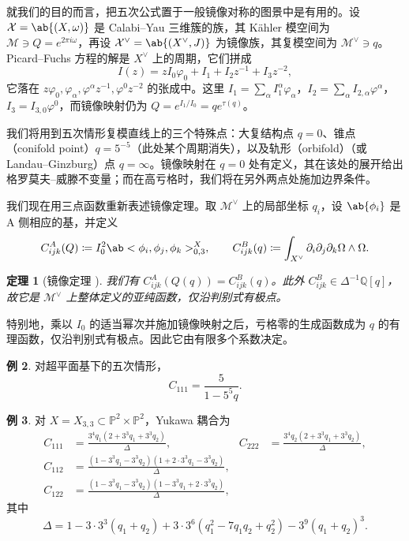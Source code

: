\documentclass{amsart}
\newtheorem{thm}{定理}[section]
\theoremstyle{definition}
\newtheorem{exm}[thm]{例}
\theoremstyle{remark}
\theoremstyle{plain}
\theoremstyle{definition}
\theoremstyle{remark}
\newcommand{\Q}{\mathbb{Q}}
\renewcommand{\P}{\mathbb{P}}
\newcommand{\mc}[1]{\mathcal{#1}}
\newcommand{\1}{\mathbf{1}}
\newcommand{\2}{\mathbf{2}}
\newcommand{\3}{\mathbf{3}}
\begin{document}
就我们的目的而言，把五次公式置于一般镜像对称的图景中是有用的。设 \(\mc{X} = \ab\{(X,\omega)\}\) 是 Calabi–Yau 三维簇的族，其 Kähler 模空间为 \(\mc{M} \ni Q = e^{2\pi i \omega}\)，再设 \(\mc{X}^{\vee} = \ab\{(X^{\vee},J)\}\) 为镜像族，其复模空间为 \(\mc{M}^{\vee} \ni q\)。Picard–Fuchs 方程的解是 \(X^{\vee}\) 上的周期，它们拼成
\[ I(z) = zI_0\varphi_0 + I_1 + I_2 z^{-1} + I_3 z^{-2}, \]
它落在 \(z\varphi_0, \varphi_{\alpha}, \varphi^{\alpha}z^{-1}, \varphi^0 z^{-2}\) 的张成中。这里 \(I_1 = \sum_{\alpha} I_1^{\alpha}\varphi_{\alpha}\)，\(I_2 = \sum_{\alpha} I_{2,\alpha}\varphi^{\alpha}\)，\(I_3 = I_{3,0}\varphi^0\)，而镜像映射仍为 \(Q = e^{I_1/I_0} = qe^{\tau(q)}\)。

我们将用到五次情形复模直线上的三个特殊点：大复结构点 \(q=0\)、锥点（conifold point）\(q = 5^{-5}\)（此处某个周期消失），以及轨形（orbifold）（或 Landau–Ginzburg）点 \(q = \infty\)。镜像映射在 \(q=0\) 处有定义，其在该处的展开给出格罗莫夫–威滕不变量；而在高亏格时，我们将在另外两点处施加边界条件。

我们现在用三点函数重新表述镜像定理。取 \(\mc{M}^{\vee}\) 上的局部坐标 \(q_i\)，设 \(\ab\{\phi_i\}\) 是 A 侧相应的基，并定义
\[ C^A_{ijk}(Q) \coloneqq I_0^2 \ab<\phi_i, \phi_j, \phi_k>^X_{0,3}, \qquad C^B_{ijk}(q) \coloneqq \int_{X^{\vee}} \partial_i \partial_j \partial_k \Omega \wedge \Omega. \]

\begin{thm}[镜像定理 {\cite{Givental1998,LLY1997}}]
    我们有 \(C^A_{ijk}(Q(q)) = C^B_{ijk}(q)\)。此外 \(C^B_{ijk} \in \Delta^{-1}\Q[q]\)，故它是 \(\mc{M}^{\vee}\) 上整体定义的亚纯函数，仅沿判别式有极点。
\end{thm}

特别地，乘以 \(I_0\) 的适当幂次并施加镜像映射之后，亏格零的生成函数成为 \(q\) 的有理函数，仅沿判别式有极点。因此它由有限多个系数决定。

\begin{exm}
    对超平面基下的五次情形，
    \[ C_{111} = \frac{5}{1-5^5 q}. \]
\end{exm}

\begin{exm}
    对 \(X = X_{3,3} \subset \P^2 \times \P^2\)，Yukawa 耦合为
    \begin{align*}
        C_{111} &= \frac{3^4 q_1 (2+3^3q_1+3^3q_2)}{\Delta}, & C_{222} &= \frac{3^4 q_2(2+3^3q_1+3^3q_2)}{\Delta}, \\
        C_{112} &= \frac{(1-3^3q_1-3^3q_2)(1+2\cdot 3^3 q_1 - 3^3 q_2)}{\Delta}, \\
        C_{122} &= \frac{(1-3^3q_1-3^3q_2)(1-3^3q_1+2\cdot3^3q_2)}{\Delta},
    \end{align*}
    其中
    \[ \Delta = 1 - 3\cdot3^3(q_1+q_2) + 3\cdot3^6(q_1^2 - 7q_1q_2+q_2^2) - 3^9(q_1+q_2)^3. \]
\end{exm}
\end{document}
